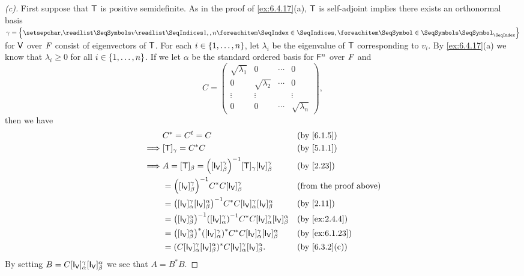 \begin{proof}[(c)]
  First suppose that \(\mathsf{T}\) is positive semidefinite.
  As in the proof of \cref{ex:6.4.17}(a), \(\mathsf{T}\) is self-adjoint implies there exists an orthonormal basis \(\gamma = \set{\seq{v}{1,,n}}\) for \(\mathsf{V}\) over \(\mathit{F}\) consist of eigenvectors of \(\mathsf{T}\).
  For each \(i \in \left\lbrace1, \dots, n\right\rbrace\), let \(\lambda_i\) be the eigenvalue of \(\mathsf{T}\) corresponding to \(v_i\).
  By \cref{ex:6.4.17}(a) we know that \(\lambda_i \geq 0\) for all \(i \in \left\lbrace1, \dots, n\right\rbrace\).
  If we let \(\alpha\) be the standard ordered basis for \(\mathsf{F}^n\) over \(\mathit{F}\) and
  \[
    C = \begin{pmatrix}
      \sqrt{\lambda_1} & 0                & \cdots & 0                \\
      0                & \sqrt{\lambda_2} & \cdots & 0                \\
      \vdots           & \vdots           &        & \vdots           \\
      0                & 0                & \cdots & \sqrt{\lambda_n}
    \end{pmatrix},
  \]
  then we have
  \begin{align*}
             & C^* = \tp{C} = C                                                                                                                          &  & \text{(by \cref{6.1.5})}      \\
    \implies & [\T]_{\gamma} = C^* C                                                                                                                     &  & \text{(by \cref{5.1.1})}      \\
    \implies & A = [\T]_{\beta} = \pa{[\IT[\V]]_{\beta}^{\gamma}}^{-1} [\T]_{\gamma} [\IT[\V]]_{\beta}^{\gamma}                                          &  & \text{(by \cref{2.23})}       \\
             & = \pa{[\IT[\V]]_{\beta}^{\gamma}}^{-1} C^* C [\IT[\V]]_{\beta}^{\gamma}                                                                   &  & \text{(from the proof above)} \\
             & = \pa{[\IT[\V]]_{\alpha}^{\gamma} [\IT[\V]]_{\beta}^{\alpha}}^{-1} C^* C [\IT[\V]]_{\alpha}^{\gamma} [\IT[\V]]_{\beta}^{\alpha}           &  & \text{(by \cref{2.11})}       \\
             & = \pa{[\IT[\V]]_{\beta}^{\alpha}}^{-1} \pa{[\IT[\V]]_{\alpha}^{\gamma}}^{-1} C^* C [\IT[\V]]_{\alpha}^{\gamma} [\IT[\V]]_{\beta}^{\alpha} &  & \text{(by \cref{ex:2.4.4})}   \\
             & = \pa{[\IT[\V]]_{\beta}^{\alpha}}^* \pa{[\IT[\V]]_{\alpha}^{\gamma}}^* C^* C [\IT[\V]]_{\alpha}^{\gamma} [\IT[\V]]_{\beta}^{\alpha}       &  & \text{(by \cref{ex:6.1.23})}  \\
             & = (C [\IT[\V]]_{\alpha}^{\gamma} [\IT[\V]]_{\beta}^{\alpha})^* C [\IT[\V]]_{\alpha}^{\gamma} [\IT[\V]]_{\beta}^{\alpha}.                  &  & \text{(by \cref{6.3.2}(c))}
  \end{align*}
  By setting \(B = C [\IT[\V]]_{\alpha}^{\gamma} [\IT[\V]]_{\beta}^{\alpha}\) we see that \(A = B^* B\).


\end{proof}
